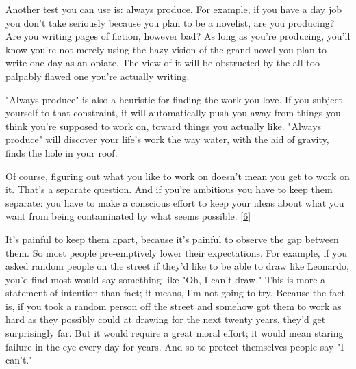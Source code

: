 Another test you can use is: always
                    produce. For example, if you have a day job you don't take
                    seriously because you plan to be a novelist, are you
                    producing? Are you writing pages of fiction, however bad? As
                    long as you're producing, you'll know you're not merely
                    using the hazy vision of the grand novel you plan to write
                    one day as an opiate. The view of it will be obstructed by
                    the all too palpably flawed one you're actually writing.

"Always
                    produce" is also a heuristic for finding the work you love.
                    If you subject yourself to that constraint, it will
                    automatically push you away from things you think you're
                    supposed to work on, toward things you actually like.
                    "Always produce" will discover your life's work the way
                    water, with the aid of gravity, finds the hole in your
                    roof.

Of course, figuring out what you like to
                    work on doesn't mean you get to work on it. That's a
                    separate question. And if you're ambitious you have to keep
                    them separate: you have to make a conscious effort to keep
                    your ideas about what you want from being contaminated by
                    what seems possible.
                    [\href{\#f6n}{6}]

It's painful to keep them apart, because it's
                    painful to observe the gap between them. So most people
                    pre-emptively lower their expectations. For example, if you
                    asked random people on the street if they'd like to be able
                    to draw like Leonardo, you'd find most would say something
                    like "Oh, I can't draw." This is more a statement of
                    intention than fact; it means, I'm not going to try. Because
                    the fact is, if you took a random person off the street and
                    somehow got them to work as hard as they possibly could at
                    drawing for the next twenty years, they'd get surprisingly
                    far. But it would require a great moral effort; it would
                    mean staring failure in the eye every day for years. And so
                    to protect themselves people say "I can't."

